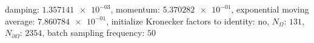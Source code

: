 damping: $\num[scientific-notation=true]{1.357141e-03}$, momentum: $\num[scientific-notation=true]{5.370282e-01}$, exponential moving average: $\num[scientific-notation=true]{7.860784e-01}$, initialize Kronecker factors to identity: $\text{no}$, $N_{\Omega}$: $\num[scientific-notation=false]{131}$, $N_{\partial\Omega}$: $\num[scientific-notation=false]{2354}$, batch sampling frequency: $\num[scientific-notation=false]{50}$